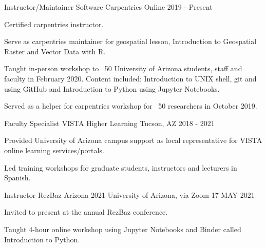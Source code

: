 


\begin{cventries}

\cventry
{Instructor/Maintainer} %
{Software Carpentries} %
{Online} %
{2019 - Present} %
{ %
\begin{cvitems}
\item {Certified carpentries instructor.}
\item {Serve as carpentries maintainer for geospatial lesson, Introduction to Geospatial Raster and Vector Data with R.}
\item {Taught in-person workshop to ~50 University of Arizona students, staff and faculty in February 2020. Content included: Introduction to UNIX shell, git and using GitHub and Introduction to Python using Jupyter Notebooks.}
\item {Served as a helper for carpentries workshop for ~50 researchers in October 2019.}
\end{cvitems}
}


\cventry
{Faculty Specialist} %
{VISTA Higher Learning} %
{Tucson, AZ} %
{2018 - 2021} %
{ %
\begin{cvitems}
\item {Provided University of Arizona campus support as local representative for VISTA online learning services/portals.}
\item {Led training workshops for graduate students, instructors and lecturers in Spanish.}
\end{cvitems}
}

\cventry
{Instructor} %
{RezBaz Arizona 2021} %
{University of Arizona, via Zoom} %
{17 MAY 2021} %
{ %
\begin{cvitems}
\item {Invited to present at the annual RezBaz conference.}
\item {Taught 4-hour online workshop using Jupyter Notebooks and Binder called Introduction to Python.}
\end{cvitems}
}


\end{cventries}

